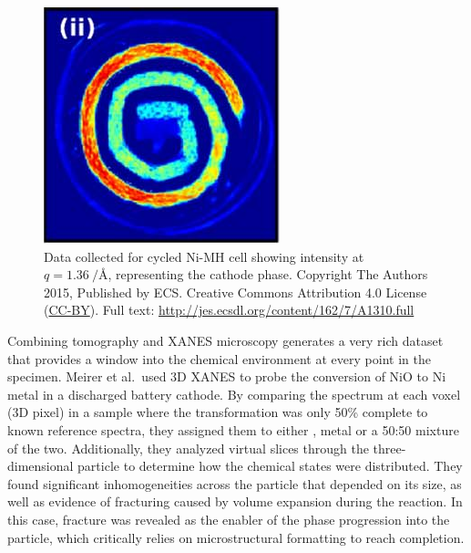 \documentclass[journal=cmatex,manuscript=perspective]{achemso}
\begin{document}
\begin{figure}
  \includegraphics[width=\textwidth]{jensen2015.png}
  \caption{Data collected for cycled Ni-MH cell showing intensity at
    $q = \SI{1.36}{\per\angstrom}$, representing the cathode
    phase.\cite{jensen2015} Copyright The Authors 2015, Published by
    ECS. Creative Commons Attribution 4.0 License
    (\href{http://creativecommons.org/licenses/by/4.0/}{CC-BY}). Full
    text: \url{http://jes.ecsdl.org/content/162/7/A1310.full}}
  \label{figure:jensen2015}
\end{figure}

Combining tomography and XANES microscopy generates a very rich
dataset that provides a window into the chemical environment at every
point in the specimen. Meirer et al.\ used 3D XANES to probe the
conversion of NiO to Ni metal in a discharged battery
cathode\cite{meirer2011}. By comparing the spectrum at each voxel (3D
pixel) in a sample where the transformation was only 50\% complete to
known reference spectra, they assigned them to either ,  metal or
a 50:50 mixture of the two. Additionally, they analyzed virtual slices
through the three-dimensional particle to determine how the chemical
states were distributed. They found significant inhomogeneities across
the particle that depended on its size, as well as evidence of
fracturing caused by volume expansion during the reaction. In this
case, fracture was revealed as the enabler of the phase progression
into the particle, which critically relies on microstructural
formatting to reach completion.
\end{document}
